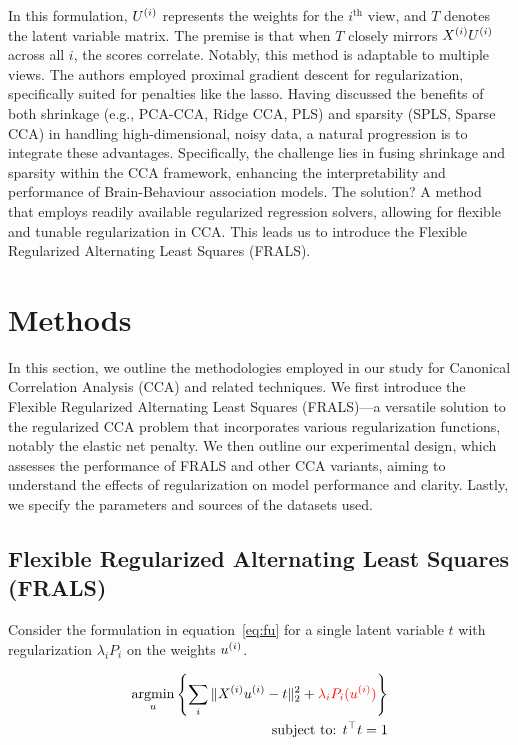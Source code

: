 In this formulation, \(U^{(i)}\) represents the \gls{weights} for the $i^{\text{th}}$ view, and \(T\) denotes the latent variable matrix.
The premise is that when \(T\) closely mirrors \(X^{(i)} U^{(i)}\) across all \(i\), the scores correlate.
Notably, this method is adaptable to multiple views.
The authors employed proximal gradient descent for regularization, specifically suited for penalties like the lasso.
Having discussed the benefits of both shrinkage (e.g., PCA-CCA, Ridge CCA, PLS) and sparsity (SPLS, Sparse CCA) in handling high-dimensional, noisy data, a natural progression is to integrate these advantages.
Specifically, the challenge lies in fusing shrinkage and sparsity within the CCA framework, enhancing the interpretability and performance of Brain-Behaviour association models.
The solution?
A method that employs readily available regularized regression solvers, allowing for flexible and tunable regularization in CCA.
This leads us to introduce the Flexible Regularized Alternating Least Squares (FRALS).

\section{Methods}

In this section, we outline the methodologies employed in our study for Canonical Correlation Analysis (CCA) and related techniques.
We first introduce the Flexible Regularized Alternating Least Squares (FRALS)—a versatile solution to the regularized CCA problem that incorporates various regularization functions, notably the elastic net penalty\cite{zou2005regularization}.
We then outline our experimental design, which assesses the performance of FRALS and other CCA variants, aiming to understand the effects of regularization on model performance and clarity.
Lastly, we specify the parameters and sources of the datasets used.

\subsection{Flexible Regularized Alternating Least Squares (FRALS)}\label{subsec:flexible-regularized-alternating-least
-squares-(frals)}

Consider the formulation in equation~\ref{eq:fu} for a single latent variable \(t\) with regularization $\lambda_i P_i$ on the \gls{weights} \(u^{(i)}\).

\begin{align}
    \underset{u}{\mathrm{argmin}}\left\{\sum_i \|X^{(i)} u^{(i)} - t\|_2^2 + \textcolor{red}{\lambda_i P_i(u^{(i)})} \right\}\\
    \text{subject to: }t^\top t = 1\\
\end{align}

